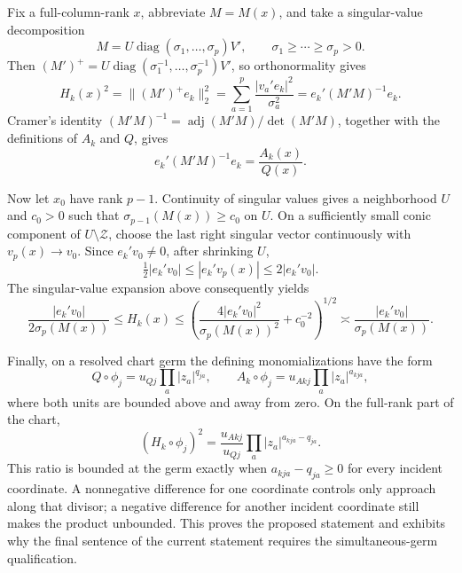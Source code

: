 Fix a full-column-rank \(x\), abbreviate \(M=M(x)\), and take a singular-value decomposition
\[
M=U\operatorname{diag}(\sigma _1,\ldots,\sigma _p)V',
\qquad \sigma _1\ge\cdots\ge\sigma _p>0.
\]
Then \((M')^+=U\operatorname{diag}(\sigma _1^{-1},\ldots,\sigma _p^{-1})V'\), so orthonormality gives
\[
H_k(x)^2=\|(M')^+e_k\|_2^2
=\sum_{a=1}^p\frac{|v_a'e_k|^2}{\sigma _a^2}
=e_k'(M'M)^{-1}e_k.
\]
Cramer's identity \((M'M)^{-1}=\operatorname{adj}(M'M)/\det(M'M)\), together with the definitions of \(A_k\) and \(Q\), gives
\[
e_k'(M'M)^{-1}e_k=\frac{A_k(x)}{Q(x)}.
\]

Now let \(x_0\) have rank \(p-1\). Continuity of singular values gives a neighborhood \(U\) and \(c_0>0\) such that \(\sigma_{p-1}(M(x))\ge c_0\) on \(U\). On a sufficiently small conic component of \(U\setminus\mathcal Z\), choose the last right singular vector continuously with \(v_p(x)\to v_0\). Since \(e_k'v_0\ne0\), after shrinking \(U\),
\[
\tfrac12|e_k'v_0|\le |e_k'v_p(x)|\le 2|e_k'v_0|.
\]
The singular-value expansion above consequently yields
\[
\frac{|e_k'v_0|}{2\sigma_p(M(x))}
\le H_k(x)
\le \left(\frac{4|e_k'v_0|^2}{\sigma_p(M(x))^2}+c_0^{-2}\right)^{1/2}
\asymp \frac{|e_k'v_0|}{\sigma_p(M(x))}.
\]

Finally, on a resolved chart germ the defining monomializations have the form
\[
Q\circ\phi_j=u_{Qj}\prod_a|z_a|^{q_{ja}},
\qquad
A_k\circ\phi_j=u_{Akj}\prod_a|z_a|^{a_{kja}},
\]
where both units are bounded above and away from zero. On the full-rank part of the chart,
\[
(H_k\circ\phi_j)^2
=\frac{u_{Akj}}{u_{Qj}}\prod_a|z_a|^{a_{kja}-q_{ja}}.
\]
This ratio is bounded at the germ exactly when \(a_{kja}-q_{ja}\ge0\) for every incident coordinate. A nonnegative difference for one coordinate controls only approach along that divisor; a negative difference for another incident coordinate still makes the product unbounded. This proves the proposed statement and exhibits why the final sentence of the current statement requires the simultaneous-germ qualification.
